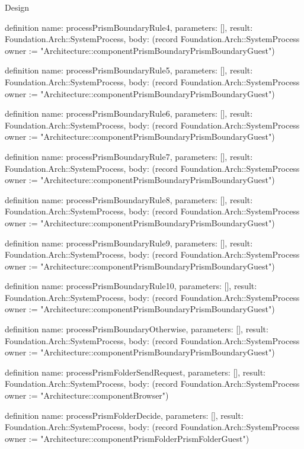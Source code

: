 \begin{lexlean}{Design}
\begin{semanticmodule}
definition{
  name: processPrismBoundaryRule4,
  parameters: [],
  result: Foundation.Arch::SystemProcess,
  body: (record Foundation.Arch::SystemProcess {owner := "Architecture::componentPrismBoundaryPrismBoundaryGuest"})
}

definition{
  name: processPrismBoundaryRule5,
  parameters: [],
  result: Foundation.Arch::SystemProcess,
  body: (record Foundation.Arch::SystemProcess {owner := "Architecture::componentPrismBoundaryPrismBoundaryGuest"})
}

definition{
  name: processPrismBoundaryRule6,
  parameters: [],
  result: Foundation.Arch::SystemProcess,
  body: (record Foundation.Arch::SystemProcess {owner := "Architecture::componentPrismBoundaryPrismBoundaryGuest"})
}

definition{
  name: processPrismBoundaryRule7,
  parameters: [],
  result: Foundation.Arch::SystemProcess,
  body: (record Foundation.Arch::SystemProcess {owner := "Architecture::componentPrismBoundaryPrismBoundaryGuest"})
}

definition{
  name: processPrismBoundaryRule8,
  parameters: [],
  result: Foundation.Arch::SystemProcess,
  body: (record Foundation.Arch::SystemProcess {owner := "Architecture::componentPrismBoundaryPrismBoundaryGuest"})
}

definition{
  name: processPrismBoundaryRule9,
  parameters: [],
  result: Foundation.Arch::SystemProcess,
  body: (record Foundation.Arch::SystemProcess {owner := "Architecture::componentPrismBoundaryPrismBoundaryGuest"})
}

definition{
  name: processPrismBoundaryRule10,
  parameters: [],
  result: Foundation.Arch::SystemProcess,
  body: (record Foundation.Arch::SystemProcess {owner := "Architecture::componentPrismBoundaryPrismBoundaryGuest"})
}

definition{
  name: processPrismBoundaryOtherwise,
  parameters: [],
  result: Foundation.Arch::SystemProcess,
  body: (record Foundation.Arch::SystemProcess {owner := "Architecture::componentPrismBoundaryPrismBoundaryGuest"})
}

definition{
  name: processPrismFolderSendRequest,
  parameters: [],
  result: Foundation.Arch::SystemProcess,
  body: (record Foundation.Arch::SystemProcess {owner := "Architecture::componentBrowser"})
}

definition{
  name: processPrismFolderDecide,
  parameters: [],
  result: Foundation.Arch::SystemProcess,
  body: (record Foundation.Arch::SystemProcess {owner := "Architecture::componentPrismFolderPrismFolderGuest"})
}


\end{semanticmodule}
\end{lexlean}
